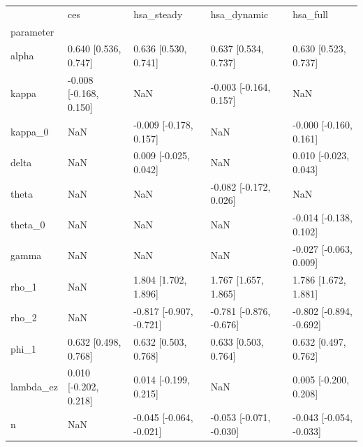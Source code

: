 \begin{tabular}{lllll}
\toprule
 & ces & hsa\_steady & hsa\_dynamic & hsa\_full \\
parameter &  &  &  &  \\
\midrule
alpha & 0.640 [0.536, 0.747] & 0.636 [0.530, 0.741] & 0.637 [0.534, 0.737] & 0.630 [0.523, 0.737] \\
kappa & -0.008 [-0.168, 0.150] & NaN & -0.003 [-0.164, 0.157] & NaN \\
kappa\_0 & NaN & -0.009 [-0.178, 0.157] & NaN & -0.000 [-0.160, 0.161] \\
delta & NaN & 0.009 [-0.025, 0.042] & NaN & 0.010 [-0.023, 0.043] \\
theta & NaN & NaN & -0.082 [-0.172, 0.026] & NaN \\
theta\_0 & NaN & NaN & NaN & -0.014 [-0.138, 0.102] \\
gamma & NaN & NaN & NaN & -0.027 [-0.063, 0.009] \\
rho\_1 & NaN & 1.804 [1.702, 1.896] & 1.767 [1.657, 1.865] & 1.786 [1.672, 1.881] \\
rho\_2 & NaN & -0.817 [-0.907, -0.721] & -0.781 [-0.876, -0.676] & -0.802 [-0.894, -0.692] \\
phi\_1 & 0.632 [0.498, 0.768] & 0.632 [0.503, 0.768] & 0.633 [0.503, 0.764] & 0.632 [0.497, 0.762] \\
lambda\_ez & 0.010 [-0.202, 0.218] & 0.014 [-0.199, 0.215] & NaN & 0.005 [-0.200, 0.208] \\
n & NaN & -0.045 [-0.064, -0.021] & -0.053 [-0.071, -0.030] & -0.043 [-0.054, -0.033] \\
\bottomrule
\end{tabular}
